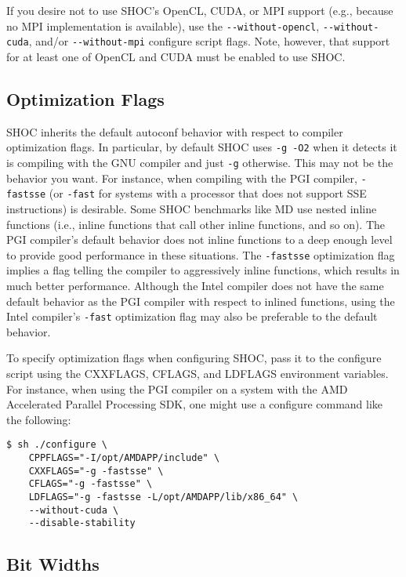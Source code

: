 \documentclass[11pt]{article}
\begin{document}
If you desire not to use SHOC's OpenCL, CUDA, or MPI support (e.g., because
no MPI implementation is available), use the \verb+--without-opencl+,
\verb+--without-cuda+,
and/or \verb+--without-mpi+ configure script flags.
Note, however, that support for at least one of OpenCL and CUDA must be
enabled to use SHOC.

\subsection{Optimization Flags}\label{sec:confoptflags}

SHOC inherits the default autoconf behavior with respect to compiler 
optimization flags.
In particular, by default SHOC uses \verb+-g -O2+ when it detects it is
compiling with the GNU compiler and just \verb+-g+ otherwise.
This may not be the behavior you want.
For instance, when compiling with the PGI compiler, \verb+-fastsse+ 
(or \verb+-fast+ for systems with a processor that does not support SSE
instructions) is desirable.
Some SHOC benchmarks like MD use nested inline functions (i.e., inline
functions that call other inline functions, and so on).
The PGI compiler's default behavior does not inline functions to a deep enough
level to provide good performance in these situations.
The \verb+-fastsse+ optimization flag implies a flag telling the compiler
to aggressively inline functions, which results in much better performance.
Although the Intel compiler does not have the same default behavior as
the PGI compiler with respect to inlined functions, using the Intel
compiler's \verb+-fast+ optimization flag may also be preferable to the
default behavior.

To specify optimization flags when configuring SHOC, pass it to the
configure script using the CXXFLAGS, CFLAGS, and LDFLAGS environment variables.
For instance, when using the PGI compiler on a system with the 
AMD Accelerated Parallel Processing SDK, one might use a configure command 
like the following:

\begin{Verbatim}[frame=single]
$ sh ./configure \
    CPPFLAGS="-I/opt/AMDAPP/include" \
    CXXFLAGS="-g -fastsse" \
    CFLAGS="-g -fastsse" \
    LDFLAGS="-g -fastsse -L/opt/AMDAPP/lib/x86_64" \
    --without-cuda \
    --disable-stability
\end{Verbatim}


\subsection{Bit Widths}\label{sec:confbitwidth}
\end{document}

